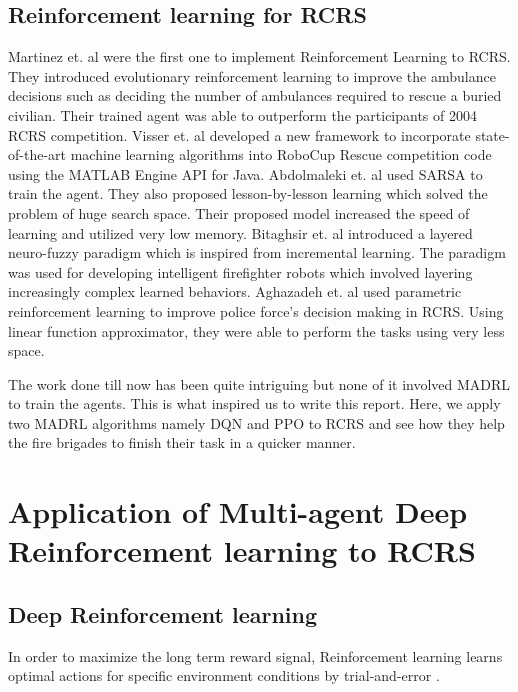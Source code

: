 \documentclass[12pt]{report}
\begin{document}
\section{Reinforcement learning for RCRS}

Martinez et. al \cite{Martinez} were the first one to implement Reinforcement Learning to RCRS. They introduced evolutionary reinforcement learning to improve the ambulance decisions such as deciding the number of ambulances required to rescue a buried civilian. Their trained agent was able to outperform the participants of 2004 RCRS competition. Visser et. al \cite{Visser2018RoboCupRS} developed a new framework to incorporate state-of-the-art machine learning algorithms into RoboCup Rescue competition code using the MATLAB Engine API for Java. Abdolmaleki et. al \cite{abdolmaleki} used SARSA to train the agent. They also proposed lesson-by-lesson learning which solved the problem of huge search space. Their proposed model increased the speed of learning and utilized very low memory. Bitaghsir et. al \cite{Bitaghsir} introduced a layered neuro-fuzzy paradigm which is inspired from incremental learning. The paradigm was used for developing intelligent firefighter robots which involved layering
increasingly complex learned behaviors. Aghazadeh et. al \cite{Aghazadeh} used parametric reinforcement learning to improve police force's decision making in RCRS. Using linear function approximator, they were able to perform the tasks using very less space. 

The work done till now has been quite intriguing but none of it involved MADRL to train the agents. This is what inspired us to write this report. Here, we apply two MADRL algorithms namely DQN \cite{Asghari} and PPO \cite{Schulman} to RCRS and see how they help the fire brigades to finish their task in a quicker manner.


\chapter{Application of Multi-agent Deep Reinforcement learning to RCRS}

\section{Deep Reinforcement learning}

In order to maximize the long term reward signal, Reinforcement learning learns optimal actions for specific environment conditions by trial-and-error \cite{Barto}. 
\end{document}
